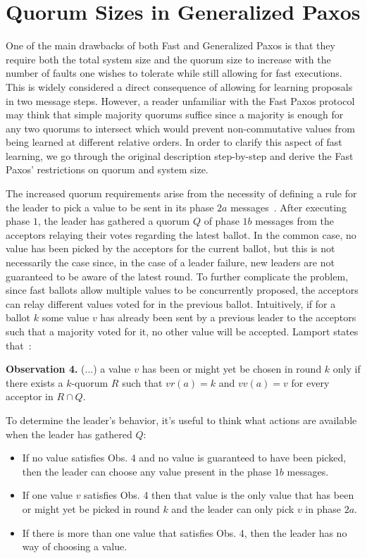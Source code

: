 \section{Quorum Sizes in Generalized Paxos} 
One of the main drawbacks of both Fast and Generalized Paxos is that they require both the total system size and the quorum size to increase with the number of faults one wishes to tolerate while still allowing for fast executions. This is widely considered a direct consequence of allowing for learning proposals in two message steps. However, a reader unfamiliar with the Fast Paxos protocol may think that simple majority quorums suffice since a majority is enough for any two quorums to intersect which would prevent non-commutative values from being learned at different relative orders. In order to clarify this aspect of fast learning, we go through the original description step-by-step and derive the Fast Paxos' restrictions on quorum and system size.\par
The increased quorum requirements arise from the necessity of defining a rule for the leader to pick a value to be sent in its phase $2a$ messages~\cite{Lamport2006}. After executing phase $1$, the leader has gathered a quorum $Q$ of phase $1b$ messages from the acceptors relaying their votes regarding the latest ballot. In the common case, no value has been picked by the acceptors for the current ballot, but this is not necessarily the case since, in the case of a leader failure, new leaders are not guaranteed to be aware of the latest round. To further complicate the problem, since fast ballots allow multiple values to be concurrently proposed, the acceptors can relay different values voted for in the previous ballot. Intuitively, if for a ballot $k$ some value $v$ has already been sent by a previous leader to the acceptors such that a majority voted for it, no other value will be accepted. Lamport states that~\cite{Lamport2006}:\par

\begin{displayquote}
	\textbf{Observation 4.} (...) a value $v$ has been or might yet be chosen in round $k$ only if there exists a $k$-quorum $R$ such that $vr(a)=k$ and $vv(a)=v$ for every acceptor in $R \cap Q$.
\end{displayquote}

To determine the leader's behavior, it's useful to think what actions are available when the leader has gathered $Q$:
\begin{itemize}
	\item If no value satisfies Obs. 4 and no value is guaranteed to have been picked, then the leader can choose any value present in the phase $1b$ messages.
	\item If one value $v$ satisfies Obs. 4 then that value is the only value that has been or might yet be picked in round $k$ and the leader can only pick $v$ in phase $2a$.
	\item If there is more than one value that satisfies Obs. 4, then the leader has no way of choosing a value.
\end{itemize} 

